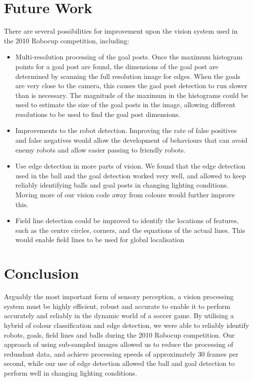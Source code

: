 \documentclass[pdftex,11pt,a4paper]{report}
\begin{document}
\section{Future Work} \label{subsubFutureWorkVision}
There are several possibilities for improvement upon the vision system used in the 2010 Robocup competition, including: \begin{itemize}
\item{Multi-resolution processing of the goal posts. Once the maximum histogram points for a goal post are found, the dimensions of the goal post are determined by scanning the full resolution image for edges. When the goals are very close to the camera, this causes the gaol post detection to run slower than is necessary. The magnitude of the maximum in the histograms could be used to estimate the size of the goal posts in the image, allowing different resolutions to be used to find the goal post dimensions.}
\item{Improvements to the robot detection. Improving the rate of false positives and false negatives would allow the development of behaviours that can avoid enemy robots and allow easier passing to friendly robots.}
\item{Use edge detection in more parts of vision. We found that the edge detection used in the ball and the goal detection worked very well, and allowed to keep reliably identifying balls and goal posts in changing lighting conditions. Moving more of our vision code away from colours would further improve this.}
\item{Field line detection could be improved to identify the locations of features, such as the centre circles, corners, and the equations of the actual lines. This would enable field lines to be used for global localisation}
\end{itemize}

\section{Conclusion}

Arguably the most important form of sensory perception, a vision processing system must be highly efficient, robust and accurate to enable it to perform accurately and reliably in the dynamic world of a soccer game. By utilising a hybrid of colour classification and edge detection, we were able to reliably identify robots, goals, field lines and balls during the 2010 Robocup competition. Our approach of using sub-sampled images allowed us to reduce the processing of redundant data, and achieve processing speeds of approximately 30 frames per second, while our use of edge detection allowed the ball and goal detection to perform well in changing lighting conditions.
\end{document}
